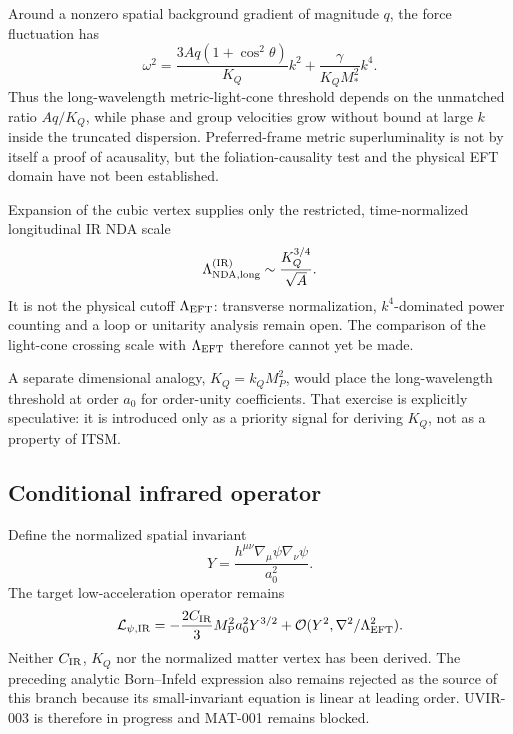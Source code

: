 Around a nonzero spatial background gradient of magnitude $q$, the force
fluctuation has
\begin{equation}
 \omega^2=\frac{3Aq(1+\cos^2\theta)}{K_Q}k^2
 +\frac{\gamma}{K_QM_*^2}k^4.
 \label{eq:force-dispersion}
\end{equation}
Thus the long-wavelength metric-light-cone threshold depends on the unmatched
ratio $Aq/K_Q$, while phase and group velocities grow without bound at large
$k$ inside the truncated dispersion.  Preferred-frame metric superluminality
is not by itself a proof of acausality, but the foliation-causality test and the
physical EFT domain have not been established.

Expansion of the cubic vertex supplies only the restricted, time-normalized
longitudinal IR NDA scale
\begin{equation}
 \Lambda_{\rm NDA,long}^{\rm (IR)}\sim\frac{K_Q^{3/4}}{\sqrt A}.
 \label{eq:long-nda}
\end{equation}
It is not the physical cutoff $\Lambda_{\rm EFT}$: transverse normalization,
$k^4$-dominated power counting and a loop or unitarity analysis remain open.
The comparison of the light-cone crossing scale with $\Lambda_{\rm EFT}$
therefore cannot yet be made.

A separate dimensional analogy, $K_Q=k_QM_P^2$, would place the
long-wavelength threshold at order $a_0$ for order-unity coefficients.  That
exercise is explicitly speculative: it is introduced only as a priority
signal for deriving $K_Q$, not as a property of ITSM.

\subsection{Conditional infrared operator}

Define the normalized spatial invariant
\begin{equation}
 Y=\frac{h^{\mu\nu}\nabla_\mu\psi\nabla_\nu\psi}{a_0^2}.
 \label{eq:Y}
\end{equation}
The target low-acceleration operator remains
\begin{equation}
 \mathcal L_{\psi,\rm IR}
 =-\frac{2C_{\rm IR}}{3}M_{\mathrm P}^2a_0^2Y^{3/2}
 +\mathcal O(Y^2,\nabla^2/\Lambda_{\rm EFT}^2).
 \label{eq:ir-action}
\end{equation}
Neither $C_{\rm IR}$, $K_Q$ nor the normalized matter vertex has been derived.
The preceding analytic Born--Infeld expression also remains rejected as the
source of this branch because its small-invariant equation is linear at
leading order.  UVIR-003 is therefore in progress and MAT-001 remains blocked.
